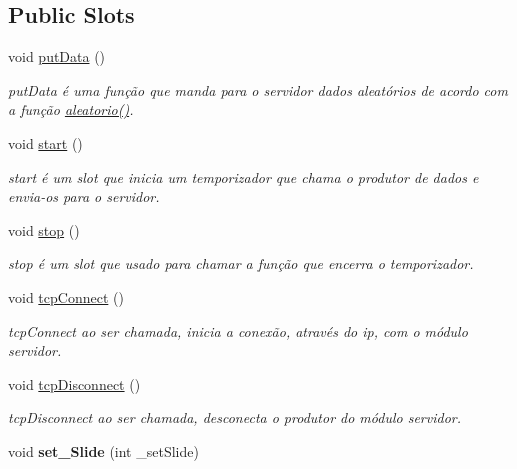 \subsection*{Public Slots}
\begin{DoxyCompactItemize}
\item 
\mbox{\label{class_main_window_afdfeb13ec363b0eb8ecacaf0aa13b605}} 
void \mbox{\hyperlink{class_main_window_afdfeb13ec363b0eb8ecacaf0aa13b605}{put\+Data}} ()
\begin{DoxyCompactList}\small\item\em put\+Data é uma função que manda para o servidor dados aleatórios de acordo com a função {\itshape \mbox{\hyperlink{class_main_window_ab29e2b2ee8118c9d36c45820309a9093}{aleatorio()}}}. \end{DoxyCompactList}\item 
\mbox{\label{class_main_window_a5edcbc314e782645cdf4db101eeb247d}} 
void \mbox{\hyperlink{class_main_window_a5edcbc314e782645cdf4db101eeb247d}{start}} ()
\begin{DoxyCompactList}\small\item\em start é um slot que inicia um temporizador que chama o produtor de dados e envia-\/os para o servidor. \end{DoxyCompactList}\item 
\mbox{\label{class_main_window_a939e90ddfe07d74be87b351ca2171fb0}} 
void \mbox{\hyperlink{class_main_window_a939e90ddfe07d74be87b351ca2171fb0}{stop}} ()
\begin{DoxyCompactList}\small\item\em stop é um slot que usado para chamar a função que encerra o temporizador. \end{DoxyCompactList}\item 
\mbox{\label{class_main_window_ac5b669957c442b6eb68573dacfce33e1}} 
void \mbox{\hyperlink{class_main_window_ac5b669957c442b6eb68573dacfce33e1}{tcp\+Connect}} ()
\begin{DoxyCompactList}\small\item\em tcp\+Connect ao ser chamada, inicia a conexão, através do ip, com o módulo servidor. \end{DoxyCompactList}\item 
\mbox{\label{class_main_window_a4d22c4c7afc7ba0a2fa4c70515c85dda}} 
void \mbox{\hyperlink{class_main_window_a4d22c4c7afc7ba0a2fa4c70515c85dda}{tcp\+Disconnect}} ()
\begin{DoxyCompactList}\small\item\em tcp\+Disconnect ao ser chamada, desconecta o produtor do módulo servidor. \end{DoxyCompactList}\item 
\mbox{\label{class_main_window_a9f48ef6d2de51afb05df9c7469975dbc}} 
void {\bfseries set\+\_\+\+Slide} (int \+\_\+set\+Slide)
\end{DoxyCompactItemize}
